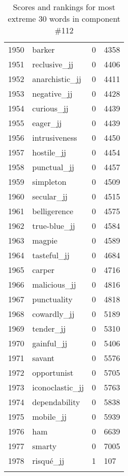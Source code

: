\begin{longtable}[!htbp]{| rlr@{.}l |}
    1950 & barker & 0 & 4358 \\
    1951 & reclusive\_jj & 0 & 4406 \\
    1952 & anarchistic\_jj & 0 & 4411 \\
    1953 & negative\_jj & 0 & 4428 \\
    1954 & curious\_jj & 0 & 4439 \\
    1955 & eager\_jj & 0 & 4439 \\
    1956 & intrusiveness & 0 & 4450 \\
    1957 & hostile\_jj & 0 & 4454 \\
    1958 & punctual\_jj & 0 & 4457 \\
    1959 & simpleton & 0 & 4509 \\
    1960 & secular\_jj & 0 & 4515 \\
    1961 & belligerence & 0 & 4575 \\
    1962 & true-blue\_jj & 0 & 4584 \\
    1963 & magpie & 0 & 4589 \\
    1964 & tasteful\_jj & 0 & 4684 \\
    1965 & carper & 0 & 4716 \\
    1966 & malicious\_jj & 0 & 4816 \\
    1967 & punctuality & 0 & 4818 \\
    1968 & cowardly\_jj & 0 & 5189 \\
    1969 & tender\_jj & 0 & 5310 \\
    1970 & gainful\_jj & 0 & 5406 \\
    1971 & savant & 0 & 5576 \\
    1972 & opportunist & 0 & 5705 \\
    1973 & iconoclastic\_jj & 0 & 5763 \\
    1974 & dependability & 0 & 5838 \\
    1975 & mobile\_jj & 0 & 5939 \\
    1976 & ham & 0 & 6639 \\
    1977 & smarty & 0 & 7005 \\
    1978 & risqué\_jj & 1 & 107 \\
    \hline
    \caption{Scores and rankings for most extreme 30 words in component \#112} \\
\end{longtable}
